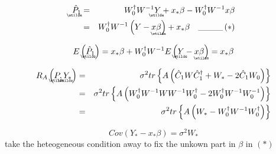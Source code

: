 \documentclass{article}
\begin{document}
\begin{eqnarray*}
\underaccent{\wtilde}{\hat{P}}%
_{1} &=&W_{0}^{\dagger }W^{-1}%
\underaccent{\wtilde}{Y}%
+x_{\ast }\beta -W_{0}^{\dagger }W^{-1}x\beta  \\
&=&W_{0}^{\dagger }W^{-1}\left( Y-x%
\underaccent{\wtilde}{\beta}%
\right) +x_{\ast }\beta \quad \_\_\_\_\left( \ast \right) 
\end{eqnarray*}

\begin{equation*}
E\left( 
\underaccent{\wtilde}{\hat{P}}%
_{1}\right) =x_{\ast }\beta +W_{0}^{\dagger }W^{-1}E\left( 
\underaccent{\wtilde}{Y}%
-x%
\underaccent{\wtilde}{\beta}%
\right) =x_{\ast }\beta 
\end{equation*}

\begin{eqnarray*}
R_{A}\left( 
\underaccent{\wtilde}{P}%
,%
\underaccent{\wtilde}{Y}%
_{\ast }\right)  &=&\sigma ^{2}tr\left\{ A\left( \hat{C}_{1}W\hat{C}%
_{1}^{\dagger }+W_{\ast }-2\hat{C}_{1}W_{0}\right) \right\}  \\
&=&\sigma ^{2}tr\left\{ A\left( W_{0}^{\dagger }W^{-1}WW^{-1}W_{0}^{\dagger
}-2W_{0}^{\dagger }W^{-1}W_{0}^{-1}\right) \right\}  \\
&=&\sigma ^{2}tr\left\{ A\left( W_{\ast }-W_{0}^{\dagger
}W^{-1}W_{0}^{\dagger }\right) \right\} 
\end{eqnarray*}

\begin{equation*}
Cov\left( Y_{\ast }-x_{\ast }\beta \right) =\sigma ^{2}W_{\ast }
\end{equation*}%
take the heteogeneous condition away to fix the unkown part in $\beta $ in $%
\left( \ast \right) $

\bigskip 
\end{document}
